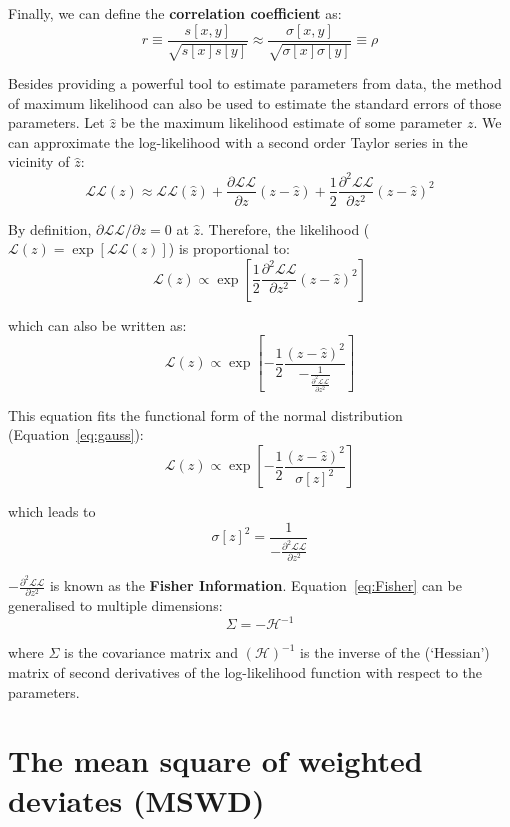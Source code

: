 \begin{refsection}
Finally, we can define the \textbf{correlation coefficient} as:
\begin{equation}
  r \equiv \frac{s[x,y]}{\sqrt{s[x]s[y]}} 
  \approx 
  \frac{\sigma[x,y]}{\sqrt{\sigma[x]\sigma[y]}}
  \equiv \rho
  \label{eq:rho}
\end{equation}

Besides providing a powerful tool to estimate parameters from data,
the method of maximum likelihood can also be used to estimate the
standard errors of those parameters. Let $\hat{z}$ be the maximum
likelihood estimate of some parameter $z$. We can approximate the
log-likelihood with a second order Taylor series in the vicinity of
$\hat{z}$:
\[
  \mathcal{LL}(z) \approx \mathcal{LL}(\hat{z}) +
  \frac{\partial\mathcal{LL}}{\partial{z}} (z-\hat{z}) +
  \frac{1}{2} \frac{\partial^2\mathcal{LL}}{\partial{z^2}} (z-\hat{z})^2
\]

By definition, $\partial{\mathcal{LL}}/\partial{z}=0$ at
$\hat{z}$. Therefore, the likelihood ($\mathcal{L}(z) =
\exp[\mathcal{LL}(z)]$) is proportional to:
\[
\mathcal{L}(z) \propto 
\exp\left[
  \frac{1}{2} \frac{\partial^2\mathcal{LL}}{\partial{z^2}} (z-\hat{z})^2
  \right]
\]

\noindent which can also be written as:
\[
\mathcal{L}(z) \propto \exp\!\left[
  -\frac{1}{2} \frac{(z-\hat{z})^2}{
    -\frac{1}{\frac{\partial^2\mathcal{LL}}{\partial{z^2}}}
  }\right]
\]

This equation fits the functional form of the normal distribution
(Equation~\ref{eq:gauss}):
\[
\mathcal{L}(z) \propto \exp\!\left[
  -\frac{1}{2} \frac{(z-\hat{z})^2}{\sigma[z]^2}
  \right]
\]

\noindent which leads to
\begin{equation}
  \sigma[z]^2 = \frac{1}{-\frac{\partial^2\mathcal{LL}}{\partial{z^2}}}
  \label{eq:Fisher}
\end{equation}

$-\frac{\partial^2\mathcal{LL}}{\partial{z^2}}$ is known as the
\textbf{Fisher Information}. Equation~\ref{eq:Fisher} can be
generalised to multiple dimensions:
\begin{equation}
  \Sigma = -\mathcal{H}^{-1}
  \label{eq:multidimFisher}
\end{equation}

\noindent where $\Sigma$ is the covariance matrix and
$(\mathcal{H})^{-1}$ is the inverse of the (`Hessian') matrix of
second derivatives of the log-likelihood function with respect to the
parameters.

\section{The mean square of weighted deviates (MSWD)}
\label{sec:mswd}


\end{refsection}
